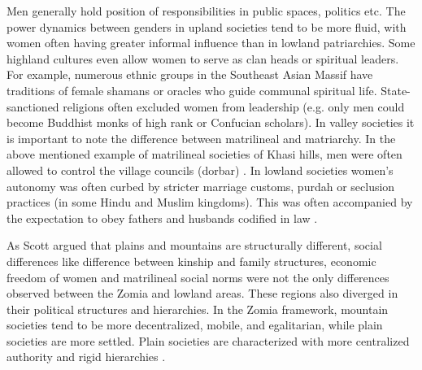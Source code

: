  Men generally hold position of responsibilities in public spaces, politics etc. The power dynamics between genders in upland societies tend to be more fluid, with women often having greater informal influence than in lowland patriarchies. Some highland cultures even allow women to serve as clan heads or spiritual leaders.  For example, numerous ethnic groups in the Southeast Asian Massif have traditions of female shamans or oracles who guide communal spiritual life. State-sanctioned religions often excluded women from leadership (e.g. only men could become Buddhist monks of high rank or Confucian scholars). In valley societies it is important to note the difference between matrilineal and matriarchy. In the above mentioned example of matrilineal societies of Khasi hills, men were often allowed to control the  village councils (dorbar) \citep{WashingtonPost_2015,TheGuardian2011}. In lowland societies women’s autonomy was often curbed by stricter marriage customs, purdah or seclusion practices (in some Hindu and Muslim kingdoms). This was often accompanied by the expectation to obey fathers and husbands codified in law \citep{Papanek_1973,Devi2019}.


As Scott argued that plains and mountains are structurally different, social differences like difference between kinship and family structures, economic freedom of women and matrilineal social norms were not the only differences observed between the Zomia and lowland areas. These regions also diverged in their political structures and hierarchies. In the Zomia framework, mountain societies tend to be more decentralized, mobile, and egalitarian, while plain societies are more settled. Plain societies are characterized with more centralized authority and rigid hierarchies \citep{Hammond_2011}.


